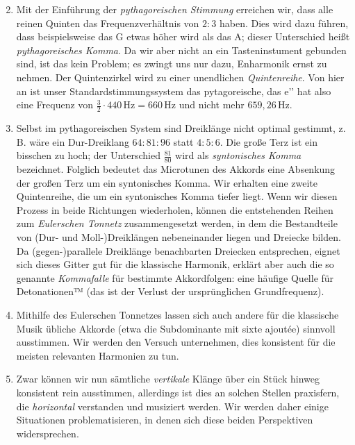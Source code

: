 \documentclass[ngerman,11pt]{scrartcl}
\begin{document}
\begin{enumerate}
  \setcounter{enumi}{1}
\item Mit der Einführung der \emph{pythagoreischen Stimmung} erreichen wir,
  dass alle reinen Quinten das Frequenzverhältnis von $2:3$ haben. Dies wird
  dazu führen, dass beispielsweise das \sharp G etwas höher wird als das
  \flat A; dieser Unterschied heißt \emph{pythagoreisches Komma}. Da wir aber 
  nicht an ein Tasteninstument 
  gebunden sind, ist das kein Problem; es zwingt uns nur dazu, Enharmonik ernst
  zu nehmen. Der Quintenzirkel wird zu einer unendlichen \emph{Quintenreihe}.
  Von hier an ist unser Standardstimmungssystem das pytagoreische, das e’’ hat
  also eine Frequenz von $\frac32\cdot 440\,\text{Hz}=660\,\text{Hz}$ und nicht
  mehr $659{,}26\,\text{Hz}$.
\item Selbst im pythagoreischen System sind Dreiklänge nicht optimal gestimmt,
  z.\,B. wäre ein Dur-Dreiklang $64:81:96$ statt $4:5:6$. Die große Terz ist ein
  bisschen zu hoch; der Unterschied $\frac{81}{80}$ wird als \emph{syntonisches
  Komma} bezeichnet. Folglich bedeutet das Microtunen des Akkords eine
  Absenkung der großen Terz um ein syntonisches Komma. Wir erhalten eine zweite
  Quintenreihe, die um ein syntonisches Komma tiefer liegt. Wenn wir diesen
  Prozess in beide Richtungen wiederholen, können die entstehenden Reihen zum
  \emph{Eulerschen Tonnetz} zusammengesetzt werden, in dem die Bestandteile von (Dur-
  und Moll-)Dreiklängen nebeneinander liegen und Dreiecke bilden. Da
  \mbox{(gegen-)}parallele Dreiklänge benachbarten Dreiecken entsprechen, eignet sich
  dieses Gitter gut für die klassische Harmonik, erklärt aber auch die so
  genannte \emph{Kommafalle} für bestimmte Akkordfolgen: eine häufige Quelle
  für Detonationen™ (das ist der Verlust der ursprünglichen Grundfrequenz).
\item Mithilfe des Eulerschen Tonnetzes lassen sich auch andere für die
  klassische Musik übliche Akkorde (etwa die Subdominante mit sixte ajoutée)
  sinnvoll ausstimmen. Wir werden den Versuch unternehmen, dies konsistent für
  die meisten relevanten Harmonien zu tun.
\item Zwar können wir nun sämtliche \emph{vertikale} Klänge über ein Stück
  hinweg konsistent rein ausstimmen, allerdings ist dies an solchen
  Stellen praxisfern, die \emph{horizontal} verstanden und musiziert werden. Wir
  werden daher einige Situationen problematisieren, in denen sich diese beiden
  Perspektiven widersprechen.

\end{enumerate}
\end{document}
